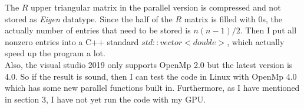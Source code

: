 \documentclass[10pt]{article}
\begin{document}
	\noindent The $R$ upper triangular matrix in the parallel version is compressed and not stored as \textit{Eigen} datatype. Since the half of the $R$ matrix is filled with 0s, the actually number of entries that need to be stored is $n(n-1)/2$. Then I put all nonzero entries into a C++ standard $std::vector<double>$, which actually speed up the program a lot.\\
	
	\noindent Also, the visual studio 2019 only supports OpenMp 2.0 but the latest version is 4.0. So if the result is sound, then I can test the code in Linux with OpenMp 4.0 which has some new parallel functions built in. Furthermore, as I have mentioned in section 3, I have not yet run the code with my GPU.\\
	
	
	
	
\end{document}
